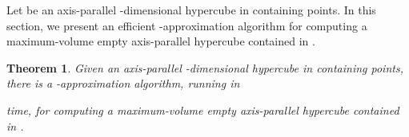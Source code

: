 \documentclass[11pt]{article}
\newtheorem{theorem}{Theorem}
\newcommand{\later}[1]{{}}
\begin{document}
Let  be an axis-parallel -dimensional hypercube in  
containing  points. In this section, we present an efficient
-approximation algorithm for computing a maximum-volume
empty axis-parallel hypercube contained in . 
\later{
Recall that 
with exact algorithms, a largest empty hypercube can be found faster
than a largest empty box~\cite{BK09a,BK09b}, as mentioned in the
introduction. In our case, with approximation algorithms, 
the situation is analogous, and we are able to obtain a faster
algorithm for finding the largest hypercube:
} 

\begin{theorem} \label{T6}
Given an axis-parallel -dimensional hypercube  in  containing
 points, there is a -approximation algorithm, running in  

time, for computing a maximum-volume empty axis-parallel hypercube 
contained in . 
\end{theorem}
\end{document}
